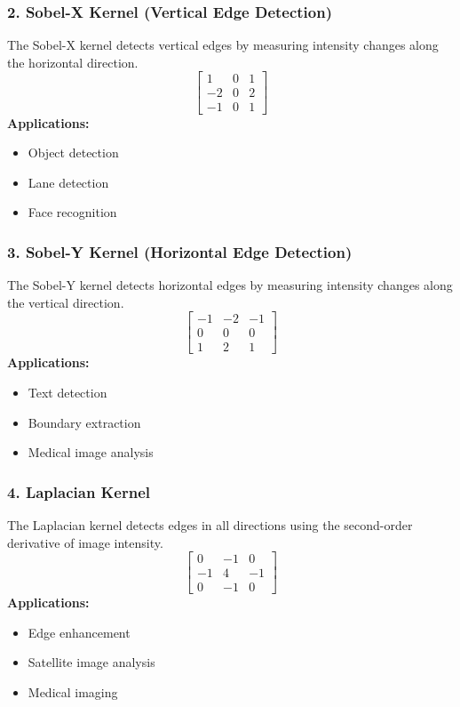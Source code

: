 \documentclass[11pt]{article}
\begin{document}
\subsubsection*{2. Sobel-X Kernel (Vertical Edge Detection)}
The Sobel-X kernel detects vertical edges by measuring intensity changes along the horizontal direction. 
$$ \begin{bmatrix} 1 & 0 & 1 \\ -2 & 0 & 2 \\ -1 & 0 & 1 \end{bmatrix} $$
\textbf{Applications:}
\begin{itemize}
    \item Object detection 
    \item Lane detection 
    \item Face recognition 
\end{itemize}

\subsubsection*{3. Sobel-Y Kernel (Horizontal Edge Detection)}
The Sobel-Y kernel detects horizontal edges by measuring intensity changes along the vertical direction. 
$$ \begin{bmatrix} -1 & -2 & -1 \\ 0 & 0 & 0 \\ 1 & 2 & 1 \end{bmatrix} $$
\textbf{Applications:}
\begin{itemize}
    \item Text detection 
    \item Boundary extraction 
    \item Medical image analysis 
\end{itemize}

\subsubsection*{4. Laplacian Kernel}
The Laplacian kernel detects edges in all directions using the second-order derivative of image intensity. 
$$ \begin{bmatrix} 0 & -1 & 0 \\ -1 & 4 & -1 \\ 0 & -1 & 0 \end{bmatrix} $$
\textbf{Applications:}
\begin{itemize}
    \item Edge enhancement 
    \item Satellite image analysis 
    \item Medical imaging 
\end{itemize}
\end{document}
